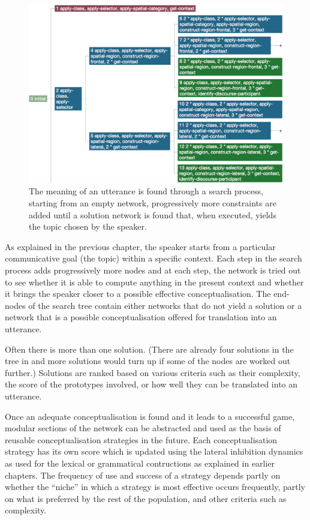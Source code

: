 \begin{figure}
\begin{centering}
\includegraphics[width=1\columnwidth]{chap12/figs/conceptualization.pdf}
\end{centering}
\caption{The meaning of an utterance is found through a search process, starting from an empty network, progressively more 
constraints are added until a solution network is found that, when executed, yields the topic chosen by the speaker.}
\label{fig:tree}
\end{figure}

As explained in the previous chapter, the speaker starts from a particular communicative goal (the topic) within a 
specific context. Each step in the search process adds progressively more nodes and at each step, the network is tried out to 
see whether it is able to compute anything in the present context and whether it brings the 
speaker closer to a possible effective conceptualisation. The end-nodes of the search tree contain either networks that 
do not yield a solution or a network that is a possible conceptualisation offered for translation into an utterance. 

Often there is more than one solution. (There are already four solutions in the tree in  and more solutions 
would turn up if some of the nodes are worked out further.) Solutions are ranked based on various criteria such as their 
complexity, the score of the prototypes involved, or how well they can be translated into an utterance.

Once an adequate conceptualisation is found and it leads to a successful game, modular sections of the network can be 
abstracted and used as the basis of reusable conceptualisation strategies in the future. Each conceptualisation 
strategy has its own score which is updated using the lateral inhibition dynamics as used for 
the lexical or grammatical contructions as explained in earlier chapters. The frequency of use and success 
of a strategy depends partly on whether the ``niche'' in which a strategy is most effective occurs frequently, partly 
on what is preferred by the rest of the population, and other criteria such as complexity.


